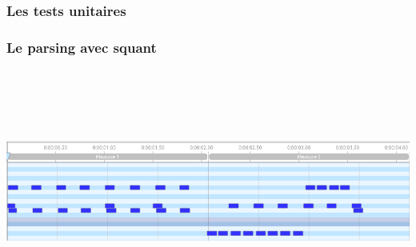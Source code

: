 \subsubsection{Les tests unitaires}
\subsubsection{Le parsing avec squant}
\includegraphics[height=80mm, width=160mm]{z_images/4_experimentations/input_parsing/midi_2bars_fill.png}
